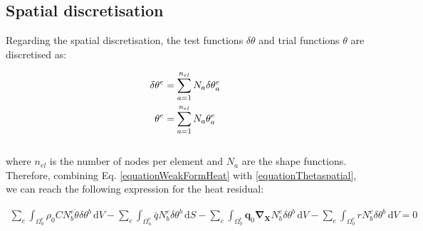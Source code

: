\documentclass[oneside,11pt,times]{book}
\begin{document}
\subsection{Spatial discretisation}

Regarding the spatial discretisation, the test functions $\delta\theta$ and trial functions $\theta$ are discretised as:

\begin{equation}
\begin{aligned}
\centering
\delta\theta^{e}&=\sum_{a=1}^{n_{el}}N_{a}\delta\theta_{a}^{e}\\
\theta^{e}&=\sum_{a=1}^{n_{el}}N_{a}\theta_{a}^{e}
\end{aligned}
\label{equationThetaspatial}
\end{equation}
\\
where $n_{el}$ is the number of nodes per element and $N_a$ are the shape functions.\\


Therefore, combining Eq. \eqref{equationWeakFormHeat} with \eqref{equationThetaspatial}, we can reach the following expression for the heat residual:

%
\begin{equation} \label{equationGlobalWeakFormHeat0}
 \begin{split}
 \sum_e \int_{\Omega_{0}^e} \rho_0C N^e_b\dot{\theta}\delta\theta^b\, \text{d} V -\sum_e \int_{\Omega_{n}^e} \bar{q} N^e_b\delta\theta^b \, \text{d} S- \sum_e \int_{\Omega_{0}^e}\bm{q}_0\bm{\nabla_{X}}N^e_b\delta\theta^b\, \text{d} V- \sum_e\int_{\Omega_{0}^e}rN^e_b\delta\theta^b\, \text{d} V=0
 \end{split}
\end{equation}
\end{document}
